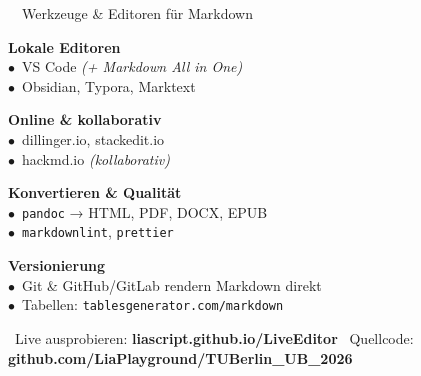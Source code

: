 \documentclass[a4paper,landscape,9pt]{extarticle}
\begin{document}
\noindent
\begin{mdinfo}{\faToolbox~~Werkzeuge \& Editoren für Markdown}
\footnotesize
\begin{minipage}[t]{0.24\linewidth}
\textbf{\color{mdblue}Lokale Editoren}\\[1pt]
$\bullet$~VS Code \textit{(+ Markdown All in One)}\\
$\bullet$~Obsidian, Typora, Marktext
\end{minipage}\hfill
\begin{minipage}[t]{0.22\linewidth}
\textbf{\color{mdblue}Online \& kollaborativ}\\[1pt]
$\bullet$~dillinger.io, stackedit.io\\
$\bullet$~hackmd.io \textit{(kollaborativ)}
\end{minipage}\hfill
\begin{minipage}[t]{0.24\linewidth}
\textbf{\color{mdblue}Konvertieren \& Qualität}\\[1pt]
$\bullet$~\texttt{pandoc} → HTML, PDF, DOCX, EPUB\\
$\bullet$~\texttt{markdownlint}, \texttt{prettier}
\end{minipage}\hfill
\begin{minipage}[t]{0.25\linewidth}
\textbf{\color{mdblue}Versionierung}\\[1pt]
$\bullet$~Git \& GitHub/GitLab rendern Markdown direkt\\
$\bullet$~Tabellen: \texttt{tablesgenerator.com/markdown}
\end{minipage}
\end{mdinfo}

\vfill
{\sffamily\scriptsize\color{muted}
\faInfoCircle~Live ausprobieren: \textbf{liascript.github.io/LiveEditor}\hfill
\faGithub~Quellcode: \textbf{github.com/LiaPlayground/TUBerlin\_UB\_2026}}

\newpage
\end{document}

